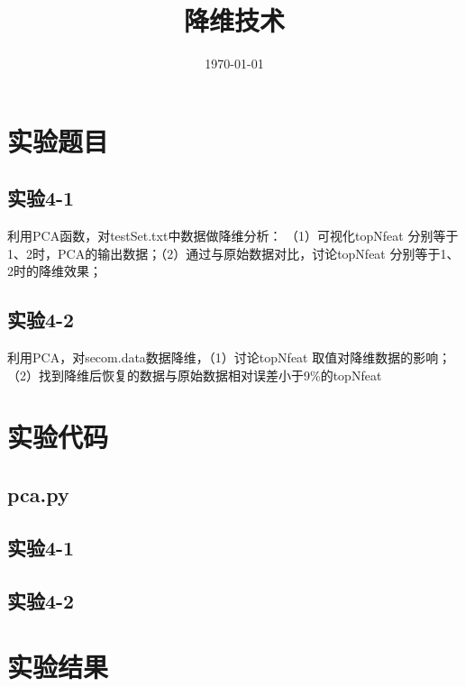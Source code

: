 \documentclass{../source/Experiment}
\title{降维技术}
\date{\today}
\begin{document}
    \makecover
    \section{实验题目}
        \subsection{实验4-1}
        利用PCA函数，对testSet.txt中数据做降维分析： （1）可视化topNfeat 分别等于1、2时，PCA的输出数据；（2）通过与原始数据对比，讨论topNfeat 分别等于1、2时的降维效果；


        \subsection{实验4-2}
       
        利用PCA，对secom.data数据降维，（1）讨论topNfeat 取值对降维数据的影响；（2）找到降维后恢复的数据与原始数据相对误差小于9\%的topNfeat
    
    \section{实验代码}
    \subsection{pca.py}
    
    \subsection{实验4-1}
    
    \subsection{实验4-2}
    

    \section{实验结果}
\end{document}
